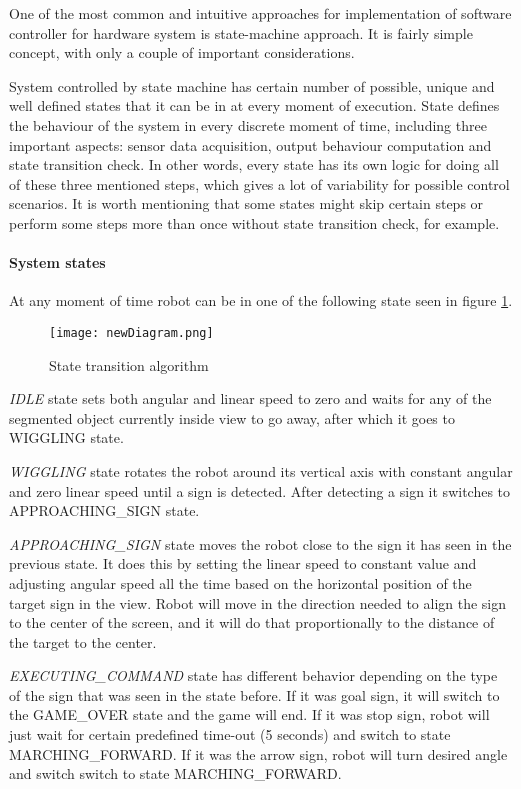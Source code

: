 
One of the most common and intuitive approaches for implementation of software controller for hardware system is state-machine approach. It is fairly simple concept, with only a couple of important considerations.

System controlled by state machine has certain number of possible, unique and well defined states that it can be in at every moment of execution. State defines the behaviour of the system in every discrete moment of time, including three important aspects: sensor data acquisition, output behaviour computation and state transition check. In other words, every state has its own logic for doing all of these three mentioned steps, which gives a lot of variability for possible control scenarios. It is worth mentioning that some states might skip certain steps or perform some steps more than once without state transition check, for example.

\paragraph{System states}

At any moment of time robot can be in one of the following state seen in figure \ref{fig:algorithm-diagram}.

\begin{figure}[ht!]
	\centering
	\texttt{[image: newDiagram.png]}
	\caption{State transition algorithm}
	\label{fig:algorithm-diagram}
\end{figure}

\textit{IDLE} state sets both angular and linear speed to zero and waits for any of the segmented object currently inside view to go away, after which it goes to WIGGLING state.

\textit{WIGGLING} state rotates the robot around its vertical axis with constant angular and zero linear speed until a sign is detected. After detecting a sign it switches to APPROACHING\_SIGN state.

\textit{APPROACHING\_SIGN} state moves the robot close to the sign it has seen in the previous state. It does this by setting the linear speed to constant value and adjusting angular speed all the time based on the horizontal position of the target sign in the view. Robot will move in the direction needed to align the sign to the center of the screen, and it will do that proportionally to the distance of the target to the center.

\textit{EXECUTING\_COMMAND} state has different behavior depending on the type of the sign that was seen in the state before. If it was goal sign, it will switch to the GAME\_OVER state and the game will end. If it was stop sign, robot will just wait for certain predefined time-out (5 seconds) and switch to state MARCHING\_FORWARD. If it was the arrow sign, robot will turn desired angle and switch switch to state MARCHING\_FORWARD.

